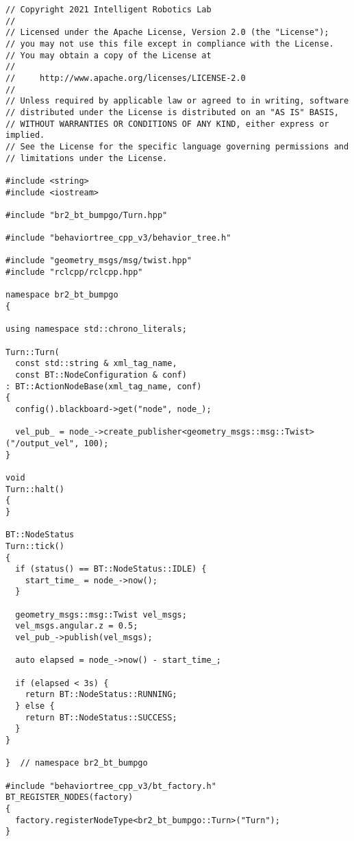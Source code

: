  \footnotesize
\begin{tcolorbox}[sharp corners, colframe=gray!80, colback=LightGray, left=0pt, top=0pt, bottom=0pt, title=\texttt{br2\_bt\_bumpgo/src/br2\_bt\_bumpgo/Turn.cpp}]
  \begin{verbatim}
// Copyright 2021 Intelligent Robotics Lab
//
// Licensed under the Apache License, Version 2.0 (the "License");
// you may not use this file except in compliance with the License.
// You may obtain a copy of the License at
//
//     http://www.apache.org/licenses/LICENSE-2.0
//
// Unless required by applicable law or agreed to in writing, software
// distributed under the License is distributed on an "AS IS" BASIS,
// WITHOUT WARRANTIES OR CONDITIONS OF ANY KIND, either express or implied.
// See the License for the specific language governing permissions and
// limitations under the License.

#include <string>
#include <iostream>

#include "br2_bt_bumpgo/Turn.hpp"

#include "behaviortree_cpp_v3/behavior_tree.h"

#include "geometry_msgs/msg/twist.hpp"
#include "rclcpp/rclcpp.hpp"

namespace br2_bt_bumpgo
{

using namespace std::chrono_literals;

Turn::Turn(
  const std::string & xml_tag_name,
  const BT::NodeConfiguration & conf)
: BT::ActionNodeBase(xml_tag_name, conf)
{
  config().blackboard->get("node", node_);

  vel_pub_ = node_->create_publisher<geometry_msgs::msg::Twist>("/output_vel", 100);
}

void
Turn::halt()
{
}

BT::NodeStatus
Turn::tick()
{
  if (status() == BT::NodeStatus::IDLE) {
    start_time_ = node_->now();
  }

  geometry_msgs::msg::Twist vel_msgs;
  vel_msgs.angular.z = 0.5;
  vel_pub_->publish(vel_msgs);

  auto elapsed = node_->now() - start_time_;

  if (elapsed < 3s) {
    return BT::NodeStatus::RUNNING;
  } else {
    return BT::NodeStatus::SUCCESS;
  }
}

}  // namespace br2_bt_bumpgo

#include "behaviortree_cpp_v3/bt_factory.h"
BT_REGISTER_NODES(factory)
{
  factory.registerNodeType<br2_bt_bumpgo::Turn>("Turn");
}
    \end{verbatim}
    \end{tcolorbox}
  \normalsize

